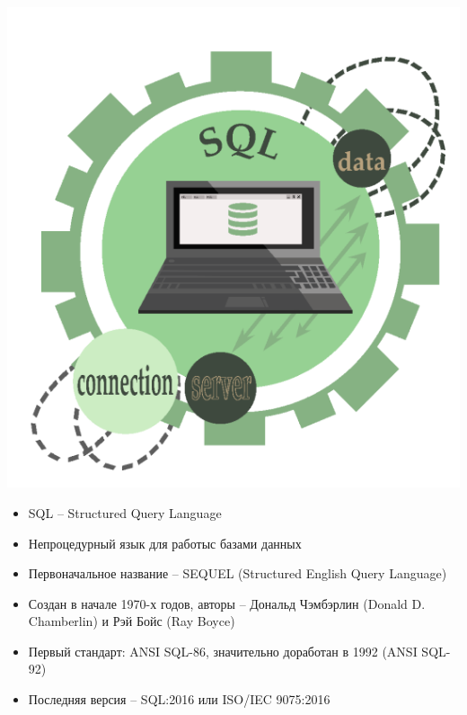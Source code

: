 \documentclass{beamer}
\begin{document}
\begin{frame}
\begin{minipage}{0.3\textwidth}
  \begin{flushleft}
	\begin{center}
		\includegraphics[scale=0.3]{images/SQL.png}
	\end{center}
  \end{flushleft}
\end{minipage}
\begin{minipage}{0.6\textwidth}
  \begin{flushright}
  	\begin{itemize}
		\item SQL – Structured Query Language
		\item Непроцедурный язык для работыс базами данных
		\item Первоначальное название – SEQUEL (Structured English Query Language)
		\item Создан в начале 1970-х годов, авторы – Дональд Чэмбэрлин (Donald D. Chamberlin) и Рэй Бойс (Ray Boyce)
		\item Первый стандарт: ANSI SQL-86, значительно доработан в 1992 (ANSI SQL-92)
		\item Последняя версия – SQL:2016 или ISO/IEC 9075:2016
  	\end{itemize}
  \end{flushright}
\end{minipage}
\end{frame}
\end{document}
